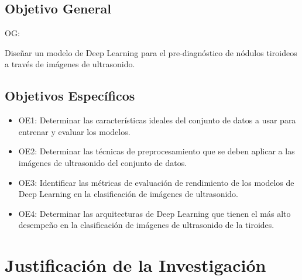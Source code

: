 \subsection{Objetivo General}
OG: \newcommand{\ObjetivoGeneral}{
Diseñar un modelo de Deep Learning para el pre-diagnóstico de nódulos tiroideos a través de imágenes de ultrasonido.
}
\ObjetivoGeneral
\subsection{Objetivos Específicos}
\newcommand{\Objone}{
Determinar las características ideales del conjunto de datos a usar para entrenar y evaluar los modelos.
}
\newcommand{\Objtwo}{
Determinar las técnicas de preprocesamiento que se deben aplicar a las imágenes de ultrasonido del conjunto de datos.
}
\newcommand{\Objthree}{
Identificar las métricas de evaluación de rendimiento de los modelos de Deep Learning en la clasificación de imágenes de ultrasonido.
}
\newcommand{\Objfour}{
Determinar las arquitecturas de Deep Learning que tienen el más alto desempeño en la clasificación de imágenes de ultrasonido de la tiroides.
}

\begin{itemize}
	\item OE1: {\Objone}
	\item OE2: {\Objtwo}
	\item OE3: {\Objthree}
	\item OE4: {\Objfour}
\end{itemize}



\section{Justificación de la Investigación}

